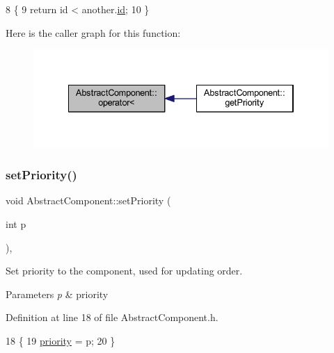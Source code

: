 \begin{DoxyCode}
8                                                                         \{
9     \textcolor{keywordflow}{return} \textcolor{keywordtype}{id} < another.\hyperlink{class_abstract_component_a9c9c548149681b1a1dd935e66ed5dd11}{id};
10 \}
\end{DoxyCode}
Here is the caller graph for this function\+:\nopagebreak
\begin{figure}[H]
\begin{center}
\leavevmode
\includegraphics[width=334pt]{class_abstract_component_a0c2e458144111c5f599c66f168516abc_icgraph}
\end{center}
\end{figure}
\mbox{\label{class_abstract_component_a58a59a9ea6c3b4c86fb3bf98ff1eaaef}} 
\subsubsection{\texorpdfstring{set\+Priority()}{setPriority()}}
{\footnotesize\ttfamily void Abstract\+Component\+::set\+Priority (\begin{DoxyParamCaption}\item[{int}]{p }\end{DoxyParamCaption})\hspace{0.3cm}{\ttfamily [inline]}, {\ttfamily [inherited]}}



Set priority to the component, used for updating order. 


\begin{DoxyParams}{Parameters}
{\em p} & priority \\
\hline
\end{DoxyParams}


Definition at line 18 of file Abstract\+Component.\+h.


\begin{DoxyCode}
18                             \{
19         \hyperlink{class_abstract_component_aff57dfa5f31be093a06b55560e33fb95}{priority} = p;
20     \}
\end{DoxyCode}
\mbox{\label{class_i_r_sensor_digital_a8d09a546a1f4b4c6533c324d98a146a9}} 
